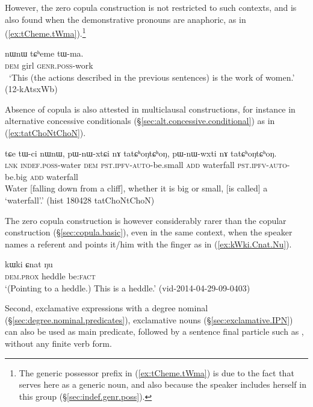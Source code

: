 However, the zero copula construction is not restricted to such contexts, and is also found when the demonstrative pronouns are anaphoric, as in (\ref{ex:tCheme.tWma}).\footnote{The generic possessor prefix in (\ref{ex:tCheme.tWma}) is due to the fact that  serves here as a generic noun, and also because the speaker includes herself in this group (§\ref{sec:indef.genr.poss}). }

\begin{exe}
\ex \label{ex:tCheme.tWma}
\gll nɯnɯ tɕʰeme tɯ-ma. \\
\textsc{dem} girl \textsc{genr}.\textsc{poss}-work \\
\glt  `This (the actions described in the previous sentences) is the work of women.' (12-kAtsxWb)
\end{exe}

Absence of copula is also attested in multiclausal constructions, for instance in alternative concessive conditionals (§\ref{sec:alt.concessive.conditional}) as in (\ref{ex:tatChoNtChoN}).

\begin{exe}
	\ex \label{ex:tatChoNtChoN}
	\gll tɕe tɯ-ci nɯnɯ, pɯ-nɯ-xtɕi nɤ tatɕʰoŋtɕʰoŋ, pɯ-nɯ-wxti nɤ tatɕʰoŋtɕʰoŋ. \\
	\textsc{lnk} \textsc{indef}.\textsc{poss}-water \textsc{dem} \textsc{pst}.\textsc{ipfv}-\textsc{auto}-be.small \textsc{add} waterfall \textsc{pst}.\textsc{ipfv}-\textsc{auto}-be.big \textsc{add} waterfall \\
	\glt Water [falling down from a cliff], whether it is big or small, [is called] a `waterfall'.' 	(hist 180428 tatChoNtChoN)
\end{exe}


The zero copula construction is however considerably rarer than the copular construction (§\ref{sec:copula.basic}), even in the same context, when the speaker names a referent and points it/him with the finger as in (\ref{ex:kWki.Cnat.Nu}).

\begin{exe}
\ex \label{ex:kWki.Cnat.Nu}
\gll  kɯki ɕnat ŋu \\
\textsc{dem}.\textsc{prox} heddle be:\textsc{fact} \\
\glt  `(Pointing to a heddle.) This is a heddle.' (vid-2014-04-29-09-0403)
\end{exe}

Second, exclamative expressions with a degree nominal (§\ref{sec:degree.nominal.predicates}), exclamative nouns (§\ref{sec:exclamative.IPN}) can also be used as main predicate, followed by a sentence final particle such as , without any finite verb form.

